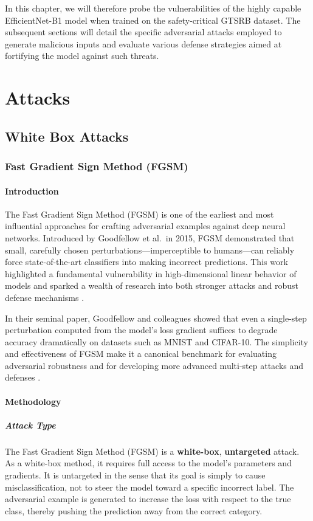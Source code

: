 \documentclass[../main.tex]{subfiles}
\begin{document}
In this chapter, we will therefore probe the vulnerabilities of the highly capable EfficientNet-B1 model when trained on the safety-critical GTSRB dataset. The subsequent sections will detail the specific adversarial attacks employed to generate malicious inputs and evaluate various defense strategies aimed at fortifying the model against such threats.
\section{Attacks}
\subsection{White Box Attacks}
\subsubsection{Fast Gradient Sign Method (FGSM)}

\paragraph{Introduction}
The Fast Gradient Sign Method (FGSM) is one of the earliest and most influential approaches for crafting adversarial examples against deep neural networks. Introduced by Goodfellow et al.\ in 2015, FGSM demonstrated that small, carefully chosen perturbations—imperceptible to humans—can reliably force state-of-the-art classifiers into making incorrect predictions. This work highlighted a fundamental vulnerability in high-dimensional linear behavior of models and sparked a wealth of research into both stronger attacks and robust defense mechanisms \cite{goodfellow2015explaining}.  

In their seminal paper, Goodfellow and colleagues showed that even a single-step perturbation computed from the model’s loss gradient suffices to degrade accuracy dramatically on datasets such as MNIST and CIFAR-10. The simplicity and effectiveness of FGSM make it a canonical benchmark for evaluating adversarial robustness and for developing more advanced multi-step attacks and defenses \cite{goodfellow2015explaining}.
\paragraph{Methodology}
\subparagraph{Attack Type}
The Fast Gradient Sign Method (FGSM) is a \textbf{white-box}, \textbf{untargeted} attack. As a white-box method, it requires full access to the model’s parameters and gradients. It is untargeted in the sense that its goal is simply to cause misclassification, not to steer the model toward a specific incorrect label. The adversarial example is generated to increase the loss with respect to the true class, thereby pushing the prediction away from the correct category.
\end{document}
